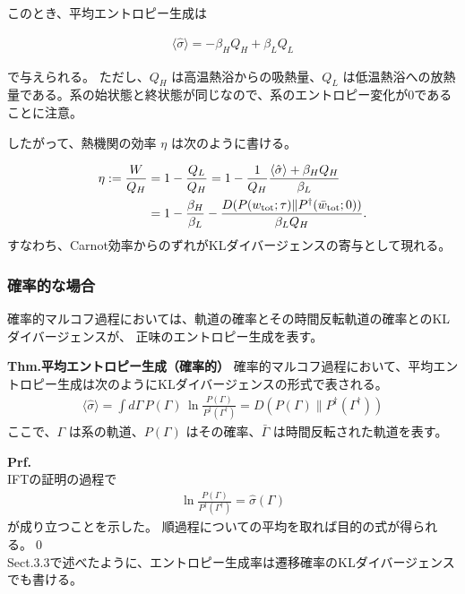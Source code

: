 \documentclass[a4paper,11pt]{jsarticle}
\numberwithin{equation}{section}
\begin{document}
このとき、平均エントロピー生成は

\begin{align}
\langle \hat{\sigma} \rangle = -\beta_H Q_H + \beta_L Q_L
\end{align}

で与えられる。
ただし、$Q_H$ は高温熱浴からの吸熱量、$Q_L$ は低温熱浴への放熱量である。系の始状態と終状態が同じなので、系のエントロピー変化が0であることに注意。

したがって、熱機関の効率 $\eta$ は次のように書ける。

\begin{align}
    \eta := \frac{W}{Q_H}
    &= 1 - \frac{Q_L}{Q_H}
    = 1 - \frac{1}{Q_H} \frac{\langle \hat{\sigma} \rangle + \beta_H Q_H}{\beta_L} \notag \\
    &= 1 - \frac{\beta_H}{\beta_L}
    - \frac{D(P(w_{\text{tot}}; \tau) \| P^{\dagger}(\bar{w}_{\text{tot}}; 0))}{\beta_L Q_H}.
\end{align}
すなわち、Carnot効率からのずれがKLダイバージェンスの寄与として現れる。

\subsubsection{確率的な場合}
確率的マルコフ過程においては、軌道の確率とその時間反転軌道の確率とのKLダイバージェンスが、
正味のエントロピー生成を表す。

\begin{itembox}[l]{\textbf{Thm.平均エントロピー生成（確率的）}}
    確率的マルコフ過程において、平均エントロピー生成は次のようにKLダイバージェンスの形式で表される。
\begin{align}
\langle \hat{\sigma} \rangle
= \int d\Gamma\, P(\Gamma)\, \ln \frac{P(\Gamma)}{P^{\dagger}({\Gamma^{\dagger}})}
= D(P(\Gamma) \| P^{\dagger}({\Gamma}^{\dagger}))
\end{align}
ここで、$\Gamma$ は系の軌道、$P(\Gamma)$ はその確率、$\bar{\Gamma}$ は時間反転された軌道を表す。
\end{itembox}
\textbf{Prf.} \\
IFTの証明の過程で
\begin{align}
\ln \frac{P(\Gamma)}{P^{\dagger}({\Gamma}^{\dagger})}
= \hat{\sigma}(\Gamma)
\end{align}
が成り立つことを示した。
順過程についての平均を取れば目的の式が得られる。\qed\\

Sect.3.3で述べたように、エントロピー生成率は遷移確率のKLダイバージェンスでも書ける。
\end{document}
